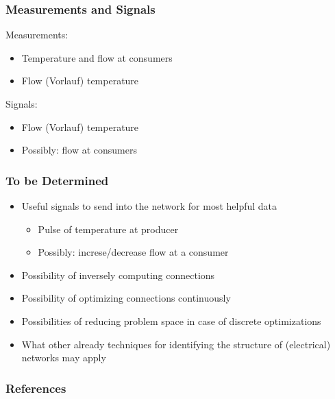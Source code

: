 \documentclass{beamer}
\begin{document}
\begin{frame}
\frametitle{Measurements and Signals}
  Measurements:
  \begin{itemize}
    \item Temperature and flow at consumers
    \item Flow (Vorlauf) temperature
  \end{itemize}

  \vspace{2em}

  Signals:
  \begin{itemize}
    \item Flow (Vorlauf) temperature
    \item Possibly: flow at consumers
  \end{itemize}
\end{frame}

\begin{frame}
\frametitle{To be Determined}
  \begin{itemize}
    \item Useful signals to send into the network for most helpful data
      \begin{itemize}
        \item Pulse of temperature at producer
        \item Possibly: increse/decrease flow at a consumer
      \end{itemize}
    \item Possibility of inversely computing connections
    \item Possibility of optimizing connections continuously
    \item Possibilities of reducing problem space in case of discrete optimizations
      \vspace{1em}
    \item What other already techniques for identifying the structure of (electrical) networks may apply
  \end{itemize}
\end{frame}

\begin{frame}
\frametitle{References}
  
  
\end{frame}
\end{document}
